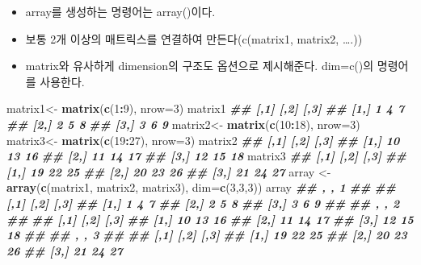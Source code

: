 \documentclass[
]{book}
\newenvironment{Shaded}{\begin{snugshade}}{\end{snugshade}}
\newcommand{\AttributeTok}[1]{\textcolor[rgb]{0.13,0.29,0.53}{#1}}
\newcommand{\DecValTok}[1]{\textcolor[rgb]{0.00,0.00,0.81}{#1}}
\newcommand{\DocumentationTok}[1]{\textcolor[rgb]{0.56,0.35,0.01}{\textbf{\textit{#1}}}}
\newcommand{\FunctionTok}[1]{\textcolor[rgb]{0.13,0.29,0.53}{\textbf{#1}}}
\newcommand{\NormalTok}[1]{#1}
\newcommand{\OtherTok}[1]{\textcolor[rgb]{0.56,0.35,0.01}{#1}}
\newcommand{\SpecialCharTok}[1]{\textcolor[rgb]{0.81,0.36,0.00}{\textbf{#1}}}
\providecommand{\tightlist}{%
  \setlength{\itemsep}{0pt}\setlength{\parskip}{0pt}}
\begin{document}
\begin{itemize}
\tightlist
\item
  array를 생성하는 명령어는 array()이다.
\item
  보통 2개 이상의 매트릭스를 연결하여 만든다(c(matrix1, matrix2, \ldots.))
\item
  matrix와 유사하게 dimension의 구조도 옵션으로 제시해준다. dim=c()의 명령어를 사용한다.
\end{itemize}

\begin{Shaded}
\begin{Highlighting}[]
\NormalTok{matrix1}\OtherTok{\textless{}{-}} \FunctionTok{matrix}\NormalTok{(}\FunctionTok{c}\NormalTok{(}\DecValTok{1}\SpecialCharTok{:}\DecValTok{9}\NormalTok{), }\AttributeTok{nrow=}\DecValTok{3}\NormalTok{)}
\NormalTok{matrix1}
\DocumentationTok{\#\#      [,1] [,2] [,3]}
\DocumentationTok{\#\# [1,]    1    4    7}
\DocumentationTok{\#\# [2,]    2    5    8}
\DocumentationTok{\#\# [3,]    3    6    9}
\NormalTok{matrix2}\OtherTok{\textless{}{-}} \FunctionTok{matrix}\NormalTok{(}\FunctionTok{c}\NormalTok{(}\DecValTok{10}\SpecialCharTok{:}\DecValTok{18}\NormalTok{), }\AttributeTok{nrow=}\DecValTok{3}\NormalTok{)}
\NormalTok{matrix3}\OtherTok{\textless{}{-}} \FunctionTok{matrix}\NormalTok{(}\FunctionTok{c}\NormalTok{(}\DecValTok{19}\SpecialCharTok{:}\DecValTok{27}\NormalTok{), }\AttributeTok{nrow=}\DecValTok{3}\NormalTok{)}
\NormalTok{matrix2}
\DocumentationTok{\#\#      [,1] [,2] [,3]}
\DocumentationTok{\#\# [1,]   10   13   16}
\DocumentationTok{\#\# [2,]   11   14   17}
\DocumentationTok{\#\# [3,]   12   15   18}
\NormalTok{matrix3}
\DocumentationTok{\#\#      [,1] [,2] [,3]}
\DocumentationTok{\#\# [1,]   19   22   25}
\DocumentationTok{\#\# [2,]   20   23   26}
\DocumentationTok{\#\# [3,]   21   24   27}
\NormalTok{array }\OtherTok{\textless{}{-}}\FunctionTok{array}\NormalTok{(}\FunctionTok{c}\NormalTok{(matrix1, matrix2, matrix3), }\AttributeTok{dim=}\FunctionTok{c}\NormalTok{(}\DecValTok{3}\NormalTok{,}\DecValTok{3}\NormalTok{,}\DecValTok{3}\NormalTok{))}
\NormalTok{array}
\DocumentationTok{\#\# , , 1}
\DocumentationTok{\#\# }
\DocumentationTok{\#\#      [,1] [,2] [,3]}
\DocumentationTok{\#\# [1,]    1    4    7}
\DocumentationTok{\#\# [2,]    2    5    8}
\DocumentationTok{\#\# [3,]    3    6    9}
\DocumentationTok{\#\# }
\DocumentationTok{\#\# , , 2}
\DocumentationTok{\#\# }
\DocumentationTok{\#\#      [,1] [,2] [,3]}
\DocumentationTok{\#\# [1,]   10   13   16}
\DocumentationTok{\#\# [2,]   11   14   17}
\DocumentationTok{\#\# [3,]   12   15   18}
\DocumentationTok{\#\# }
\DocumentationTok{\#\# , , 3}
\DocumentationTok{\#\# }
\DocumentationTok{\#\#      [,1] [,2] [,3]}
\DocumentationTok{\#\# [1,]   19   22   25}
\DocumentationTok{\#\# [2,]   20   23   26}
\DocumentationTok{\#\# [3,]   21   24   27}
\end{Highlighting}
\end{Shaded}
\end{document}
